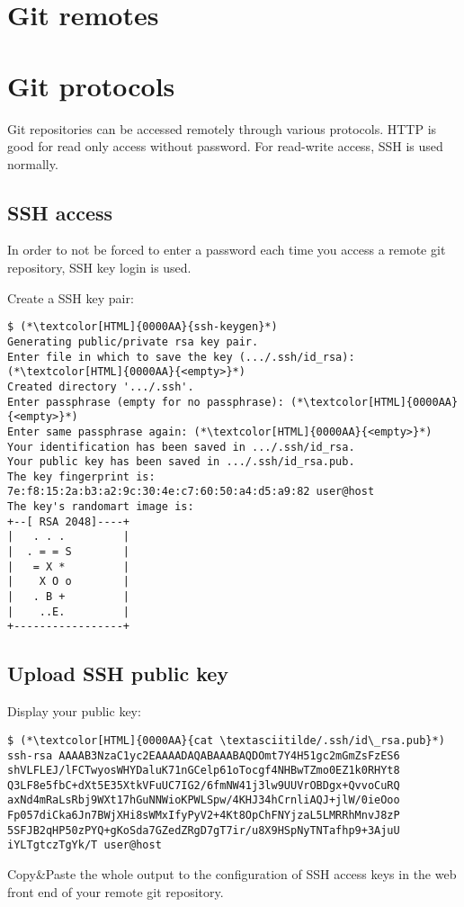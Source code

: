 \section{Git remotes}
\begin{frame}[fragile]
  \slidetitle
\end{frame}

\section{Git protocols}
\begin{frame}[fragile]
  \slidetitle
  Git repositories can be accessed remotely through various protocols. HTTP is good for read only access without password.
  For read-write access, SSH is used normally.
\end{frame}

\subsection{SSH access}
\begin{frame}[fragile]
  \subslidetitle
  In order to not be forced to enter a password each time you access a remote
  git repository, SSH key login is used.

  Create a SSH key pair:
  \begin{lstlisting}
$ (*\textcolor[HTML]{0000AA}{ssh-keygen}*)
Generating public/private rsa key pair.
Enter file in which to save the key (.../.ssh/id_rsa): (*\textcolor[HTML]{0000AA}{<empty>}*)
Created directory '.../.ssh'.
Enter passphrase (empty for no passphrase): (*\textcolor[HTML]{0000AA}{<empty>}*)
Enter same passphrase again: (*\textcolor[HTML]{0000AA}{<empty>}*)
Your identification has been saved in .../.ssh/id_rsa.
Your public key has been saved in .../.ssh/id_rsa.pub.
The key fingerprint is:
7e:f8:15:2a:b3:a2:9c:30:4e:c7:60:50:a4:d5:a9:82 user@host
The key's randomart image is:
+--[ RSA 2048]----+
|   . . .         |
|  . = = S        |
|   = X *         |
|    X O o        |
|   . B +         |
|    ..E.         |
+-----------------+
\end{lstlisting}
\end{frame}

\subsection{Upload SSH public key}
\begin{frame}[fragile]
  \subslidetitle
  Display your public key:
  \begin{lstlisting}
$ (*\textcolor[HTML]{0000AA}{cat \textasciitilde/.ssh/id\_rsa.pub}*)
ssh-rsa AAAAB3NzaC1yc2EAAAADAQABAAABAQDOmt7Y4H51gc2mGmZsFzES6
shVLFLEJ/lFCTwyosWHYDaluK71nGCelp61oTocgf4NHBwTZmo0EZ1k0RHYt8
Q3LF8e5fbC+dXt5E35XtkVFuUC7IG2/6fmNW41j3lw9UUVrOBDgx+QvvoCuRQ
axNd4mRaLsRbj9WXt17hGuNNWioKPWLSpw/4KHJ34hCrnliAQJ+jlW/0ieOoo
Fp057diCka6Jn7BWjXHi8sWMxIfyPyV2+4Kt8OpChFNYjzaL5LMRRhMnvJ8zP
5SFJB2qHP50zPYQ+gKoSda7GZedZRgD7gT7ir/u8X9HSpNyTNTafhp9+3AjuU
iYLTgtczTgYk/T user@host
\end{lstlisting}
  Copy\&Paste the whole output to the configuration of SSH access keys
  in the web front end of your remote git repository.
\end{frame}

